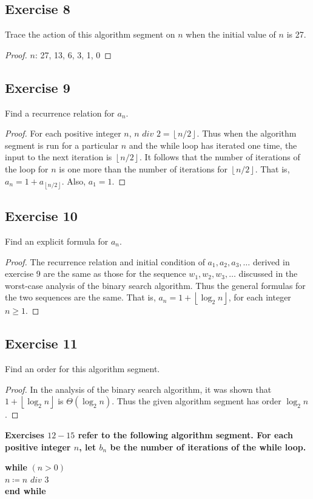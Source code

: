\documentclass[14pt]{extarticle}
\newcommand{\cy}{\color{cyan}}
\newcommand{\floor}[1]{{\left\lfloor#1\right\rfloor}}
\begin{document}
\subsection{Exercise 8}
Trace the action of this algorithm segment on \(n\) when the initial value of \(n\) is 27.

\begin{proof}
\(n\): 27, 13, 6, 3, 1, 0
\end{proof}

\subsection{Exercise 9}
Find a recurrence relation for \(a_n\).
\begin{proof}
For each positive integer \(n\), \(n \,\,div\,\, 2 = \floor{n/2}\). Thus when the algorithm segment is run for a particular 
\(n\) and the while loop has iterated one time, the input to the next iteration is \(\floor{n/2}\). It follows that the 
number of iterations of the loop for \(n\) is one more than the number of iterations for \(\floor{n/2}\). That is, 
\(a_n = 1 + a_{\floor{n/2}}\). Also, \(a_1 = 1\).
\end{proof}

\subsection{Exercise 10}
Find an explicit formula for \(a_n\).
\begin{proof}
The recurrence relation and initial condition of \(a_1, a_2, a_3, \ldots\) derived in exercise 9 are the same as those for 
the sequence \(w_1, w_2, w_3, \ldots\) discussed in the worst-case analysis of the binary search algorithm. Thus the general 
formulas for the two sequences are the same. That is, \(a_n = 1 + \floor{\log_2 n}\), for each integer \(n \geq 1\).
\end{proof}

\subsection{Exercise 11}
Find an order for this algorithm segment.

\begin{proof}
In the analysis of the binary search algorithm, it was shown that \(1 + \floor{\log_2 n}\) is \(\Theta(\log_2 n)\). Thus 
the given algorithm segment has order \(\log_2 n\).
\end{proof}

{\bf \cy Exercises \(12-15\) refer to the following algorithm segment. For each positive integer \(n\), let \(b_n\) be the 
number of iterations of the while loop.
\begin{center}
{\bf while} \((n > 0)\) \\
\hspace{2cm} \(n \coloneqq n \,\, div \,\, 3\) \\
{\bf end while}
\end{center}
}
\end{document}
